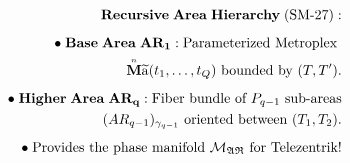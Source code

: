 \documentclass[preview]{standalone}
\begin{document}
\begin{align*}
\special{dvisvgm:raw <g id='unique000'>}\mathbf{Recursive\;Area\;Hierarchy\;(\text{SM-27}):}\\[5pt]\bullet\;\mathbf{Base\;Area\;AR_1:}\;\text{Parameterized Metroplex }\\\;\;\overset{\scriptscriptstyle n}{\mathbf{M}}\widetilde{\mathrm{a}}(t_1,\dots,t_Q)\text{ bounded by }(T, T').\\[5pt]\bullet\;\mathbf{Higher\;Area\;AR_q:}\;\text{Fiber bundle of }P_{q-1}\text{ sub-areas}\\\;\;(AR_{q-1})_{\gamma_{q-1}}\text{ oriented between }(T_1, T_2).\\[5pt]\bullet\;\text{Provides the phase manifold }\mathcal{M}_{\mathfrak{AR}}\text{ for Telezentrik!}\special{dvisvgm:raw </g>}
\end{align*}
\end{document}
